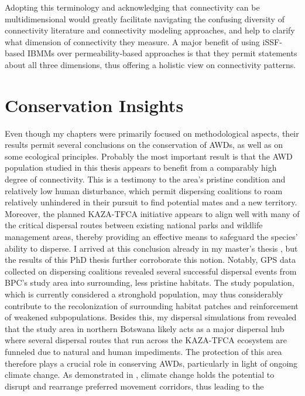 \documentclass[../FinalThesis.tex]{subfiles}
\begin{document}
Adopting this terminology and acknowledging that connectivity can be
multidimensional would greatly facilitate navigating the confusing diversity of
connectivity literature and connectivity  modeling approaches, and help to
clarify what dimension of connectivity they measure. A major benefit of using
iSSF-based IBMMs over permeability-based approaches is that they permit
statements about all three dimensions, thus offering a holistic view on
connectivity patterns.

\section{Conservation Insights}

Even though my chapters were primarily focused on methodological aspects, their
results permit several conclusions on the conservation of AWDs, as well as on
some ecological principles. Probably the most important result is that the AWD
population studied in this thesis appears to benefit from a comparably high
degree of connectivity. This is a testimony to the area's pristine condition and
relatively low human disturbance, which permit dispersing coalitions to roam
relatively unhindered in their pursuit to find potential mates and a new
territory. Moreover, the planned KAZA-TFCA initiative appears to align well with
many of the critical dispersal routes between existing national parks and
wildlife management areas, thereby providing an effective means to safeguard the
species' ability to disperse. I arrived at this conclusion already in my
master's thesis \citep{Hofmann.2021}, but the results of this PhD thesis further
corroborate this notion. Notably, GPS data collected on dispersing coalitions
revealed several successful dispersal events from BPC's study area into
surrounding, less pristine habitats. The study population, which is currently
considered a stronghold population, may thus considerably contribute to the
recolonization of surrounding habitat patches and reinforcement of weakened
subpopulations. Besides this, my dispersal simulations from
 revealed that the study area in northern Botswana
likely acts as a major dispersal hub where several dispersal routes that run
across the KAZA-TFCA ecosystem are funneled due to natural and human
impediments. The protection of this area therefore plays a crucial role in
conserving AWDs, particularly in light of ongoing climate change. As
demonstrated in , climate change holds the potential to
disrupt and rearrange preferred movement corridors, thus leading to the
\end{document}

